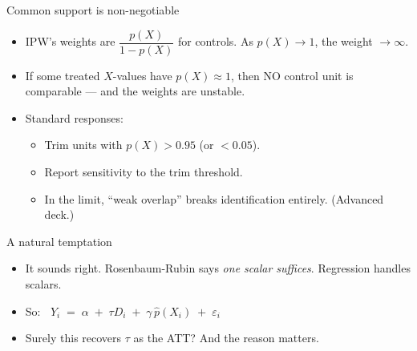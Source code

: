 \documentclass[aspectratio=169,11pt]{beamer}
\begin{document}
\begin{frame}{Common support is non-negotiable}
\vspace{0.4em}
\begin{itemize}\small
  \item IPW's weights are $\dfrac{p(X)}{1-p(X)}$ for controls. As $p(X) \to 1$, the weight $\to \infty$.
  \item If some treated $X$-values have $p(X) \approx 1$, then NO control unit is comparable --- and the weights are unstable.
  \item Standard responses:
  \begin{itemize}\small
    \item[--] Trim units with $p(X) > 0.95$ (or $< 0.05$).
    \item[--] Report sensitivity to the trim threshold.
    \item[--] In the limit, ``weak overlap'' breaks identification entirely. (Advanced deck.)
  \end{itemize}
\end{itemize}
\vspace{0.4em}
\end{frame}


\begin{frame}{A natural temptation}
\vspace{0.6em}
\vspace{0.6em}
\begin{itemize}\small
  \item It sounds right. Rosenbaum-Rubin says \textit{one scalar suffices}. Regression handles scalars.
  \item So: $\;\; Y_i \;=\; \alpha \;+\; \tau D_i \;+\; \gamma\, \widehat{p}(X_i) \;+\; \varepsilon_i$
  \item Surely this recovers $\tau$ as the ATT?  And the reason matters.
\end{itemize}
\end{frame}
\end{document}
